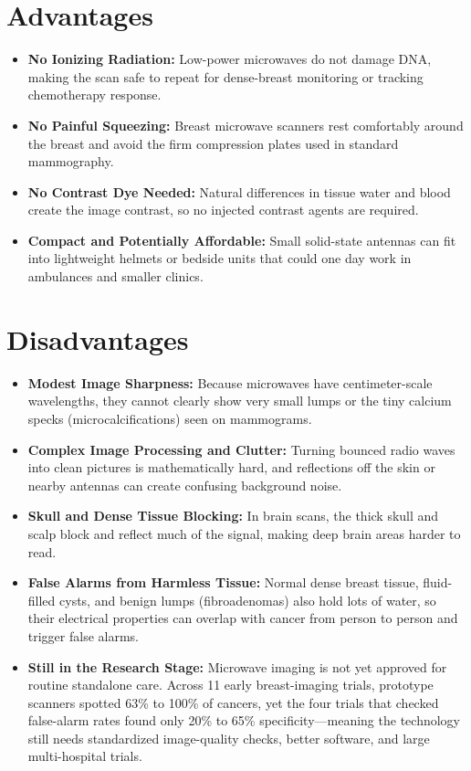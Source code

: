 \section{Advantages}
\begin{itemize}
  \item \textbf{No Ionizing Radiation:} Low-power microwaves do not damage DNA, making the scan safe to repeat for dense-breast monitoring or tracking chemotherapy response.
  \item \textbf{No Painful Squeezing:} Breast microwave scanners rest comfortably around the breast and avoid the firm compression plates used in standard mammography.
  \item \textbf{No Contrast Dye Needed:} Natural differences in tissue water and blood create the image contrast, so no injected contrast agents are required.
  \item \textbf{Compact and Potentially Affordable:} Small solid-state antennas can fit into lightweight helmets or bedside units that could one day work in ambulances and smaller clinics.
\end{itemize}

\section{Disadvantages}
\begin{itemize}
  \item \textbf{Modest Image Sharpness:} Because microwaves have centimeter-scale wavelengths, they cannot clearly show very small lumps or the tiny calcium specks (microcalcifications) seen on mammograms.
  \item \textbf{Complex Image Processing and Clutter:} Turning bounced radio waves into clean pictures is mathematically hard, and reflections off the skin or nearby antennas can create confusing background noise.
  \item \textbf{Skull and Dense Tissue Blocking:} In brain scans, the thick skull and scalp block and reflect much of the signal, making deep brain areas harder to read.
  \item \textbf{False Alarms from Harmless Tissue:} Normal dense breast tissue, fluid-filled cysts, and benign lumps (fibroadenomas) also hold lots of water, so their electrical properties can overlap with cancer from person to person and trigger false alarms.
  \item \textbf{Still in the Research Stage:} Microwave imaging is not yet approved for routine standalone care. Across 11 early breast-imaging trials, prototype scanners spotted 63\% to 100\% of cancers, yet the four trials that checked false-alarm rates found only 20\% to 65\% specificity---meaning the technology still needs standardized image-quality checks, better software, and large multi-hospital trials.
\end{itemize}

